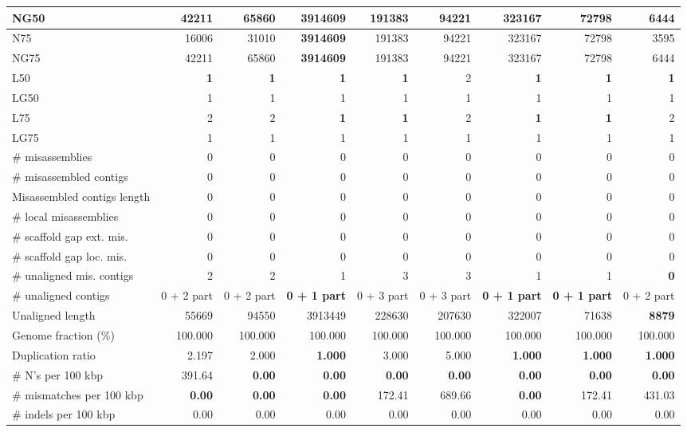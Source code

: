 \documentclass[12pt,a4paper]{article}
\begin{document}
\begin{table}[ht]
\begin{center}
\begin{tabular}{|l*{8}{|r}|}
NG50 & 42211 & 65860 & {\bf 3914609} & 191383 & 94221 & 323167 & 72798 & 6444 \\ \hline
N75 & 16006 & 31010 & {\bf 3914609} & 191383 & 94221 & 323167 & 72798 & 3595 \\ \hline
NG75 & 42211 & 65860 & {\bf 3914609} & 191383 & 94221 & 323167 & 72798 & 6444 \\ \hline
L50 & {\bf 1} & {\bf 1} & {\bf 1} & {\bf 1} & 2 & {\bf 1} & {\bf 1} & {\bf 1} \\ \hline
LG50 & 1 & 1 & 1 & 1 & 1 & 1 & 1 & 1 \\ \hline
L75 & 2 & 2 & {\bf 1} & {\bf 1} & 2 & {\bf 1} & {\bf 1} & 2 \\ \hline
LG75 & 1 & 1 & 1 & 1 & 1 & 1 & 1 & 1 \\ \hline
\# misassemblies & 0 & 0 & 0 & 0 & 0 & 0 & 0 & 0 \\ \hline
\# misassembled contigs & 0 & 0 & 0 & 0 & 0 & 0 & 0 & 0 \\ \hline
Misassembled contigs length & 0 & 0 & 0 & 0 & 0 & 0 & 0 & 0 \\ \hline
\# local misassemblies & 0 & 0 & 0 & 0 & 0 & 0 & 0 & 0 \\ \hline
\# scaffold gap ext. mis. & 0 & 0 & 0 & 0 & 0 & 0 & 0 & 0 \\ \hline
\# scaffold gap loc. mis. & 0 & 0 & 0 & 0 & 0 & 0 & 0 & 0 \\ \hline
\# unaligned mis. contigs & 2 & 2 & 1 & 3 & 3 & 1 & 1 & {\bf 0} \\ \hline
\# unaligned contigs & 0 + 2 part & 0 + 2 part & {\bf 0 + 1 part} & 0 + 3 part & 0 + 3 part & {\bf 0 + 1 part} & {\bf 0 + 1 part} & 0 + 2 part \\ \hline
Unaligned length & 55669 & 94550 & 3913449 & 228630 & 207630 & 322007 & 71638 & {\bf 8879} \\ \hline
Genome fraction (\%) & 100.000 & 100.000 & 100.000 & 100.000 & 100.000 & 100.000 & 100.000 & 100.000 \\ \hline
Duplication ratio & 2.197 & 2.000 & {\bf 1.000} & 3.000 & 5.000 & {\bf 1.000} & {\bf 1.000} & {\bf 1.000} \\ \hline
\# N's per 100 kbp & 391.64 & {\bf 0.00} & {\bf 0.00} & {\bf 0.00} & {\bf 0.00} & {\bf 0.00} & {\bf 0.00} & {\bf 0.00} \\ \hline
\# mismatches per 100 kbp & {\bf 0.00} & {\bf 0.00} & {\bf 0.00} & 172.41 & 689.66 & {\bf 0.00} & 172.41 & 431.03 \\ \hline
\# indels per 100 kbp & 0.00 & 0.00 & 0.00 & 0.00 & 0.00 & 0.00 & 0.00 & 0.00 \\ \hline

\end{tabular}
\end{center}
\end{table}
\end{document}
